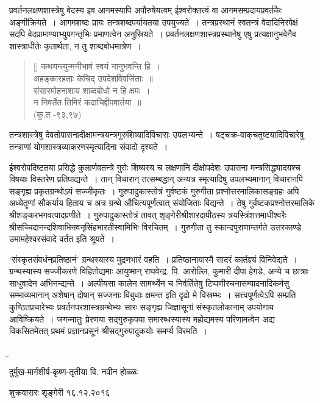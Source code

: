 	प्रवर्तनलक्षणशास्त्रेषु वेदस्य इव आगमस्यापि अपौरुषेयत्वम् ईश्वरोक्तत्त्वं वा आगमसम्प्रदायप्रवर्तकैः अङ्गीक्रियते~। आगमशब्दः प्रायः तन्त्रशब्दपर्यायतया उपयुज्यते~। तन्त्रप्रस्थानं स्वतन्त्रं  वेदादिनिरपेक्षं सदपि वेदप्रामाण्याभ्युपगन्तृभिः प्रमाणत्वेन अनुस्रियते~। प्रवर्तनलक्षणशास्त्रप्रस्थानेषु एषु प्रत्यक्षानुभवेनैव शास्त्राधीतेः कृतार्थता, न तु शाब्दबोधमात्रेण~। 
\begin{verse}[\versewidth]
		कथयन्त्युन्मनीभावं स्वयं नानुभवन्ति हि~। \\[-6pt]
		अहङ्कारहताः केचिद् उपदेशविवर्जिताः~॥\\
		संसारमोहनाशाय शाब्दबोधो न हि क्षमः~।\\[-6pt]
		न निवर्तेत तिमिरं कदाचिद्दीपवार्तया~॥\\ \hfill  (कु.त -९३,९७) 
\end{verse}

	तन्त्रशास्त्रेषु देवतोपासनादीक्षामन्त्रयन्त्रगुरुशिष्यादिविचाराः  उपलभ्यन्ते~। षट्‌चक्र-वाक्‌चतुष्टयादिविचारेषु तन्त्राणां योगशास्त्रव्याकरणस्मृत्यादिना संवादो दृश्यते~। 

	ईश्वरोपदिष्टतया प्रसिद्धे कुलार्णवतन्त्रे गुरोः शिष्यस्य च लक्षणानि दीक्षोपदेशः उपासना मन्त्रसिद्ध्यादयश्च विषयाः विस्तरेण प्रतिपाद्यन्ते~। तान् विचारान् तत्सम्बद्धान् अन्यत्र स्मृत्यादिषु उपलभ्यमानान्  विचारानपि सङ्गृह्य प्रकृतग्रन्थोऽयं सज्जीकृतः~। गुरुपादुकास्तोत्रं गुर्वष्टकं गुरुगीता प्रश्नोत्तरमालिकासङ्ग्रहः अपि अध्येतॄणां सौकर्याय  हिताय च अत्र ग्रन्थे औचित्यपूर्णत्वात् संयोजिताः विद्यन्ते~। तेषु गुर्वष्टकप्रश्नोत्तरमालिके  श्रीशङ्करभगवत्पादप्रणीते~। गुरुपादुकास्तोत्रं तावत् शृङ्गेरीश्रीशारदापीठस्य त्रयस्त्रिंशत्तमा\-धीश्वरैः श्रीसच्चिदानन्दशिवाभिनवनृसिंहभारतीस्वामिभिः विरचितम्~। गुरुगीता तु स्कान्दपुराणान्तर्गते उत्तरकाण्डे  उमामहेश्वरसंवादे वर्तत इति श्रूयते~।

	‘संस्कृतसंवर्धनप्रतिष्ठानं’ ग्रन्थस्यास्य मुद्रणभारं वहति~। प्रतिष्ठानायास्मै सादरं कार्तज्ञ्यं विनिवेद्यते~। ग्रन्थस्यास्य सज्जीकरणे विहितोद्यमाः आयुष्मान् राघवेन्द्र. पि. आरोल्लि, कुमारी दीपा हेगडे, अन्ये च छात्राः साधुवादेन अभिनन्द्यन्ते~। अल्पीयसा कालेन सामर्थ्येन च निर्वर्तितेषु टिप्पणीरचनासम्पादनादिकर्मसु सम्भाव्यमानान् अशेषान् दोषान्  सज्जनाः विबुधाः क्षमन्त इति दृढो मे विस्रम्भः~। सत्त्वपूर्णत्वेऽपि सम्प्रति कुण्ठितप्रचारेभ्यः प्रवर्तनपरशास्त्रग्रन्थेभ्यः सारः सङ्गृह्य जिज्ञासूनां संस्कृतलोकानाम् उपयोगाय आविष्क्रियते~। जगन्मातुः प्रेरणया सद्गुरुकृपया समारब्धस्यास्य महोद्यमस्य परिणामत्वेन अद्य विकसितमेतत् प्रथमं प्रज्ञानप्रसूनं श्रीसद्गुरुपादुकयोः समर्प्य विरमति~।

{\b 
\begin{center}
दुर्मुख-मार्गशीर्ष-कृष्ण-तृतीया \hfill 	वि. नवीन होळ्ळः
\end{center}
\vskip -0.5cm

शुक्रवासरः \hfil  शृङ्गेरी
\vskip -1mm
१६.१२.२०१६ 
}

